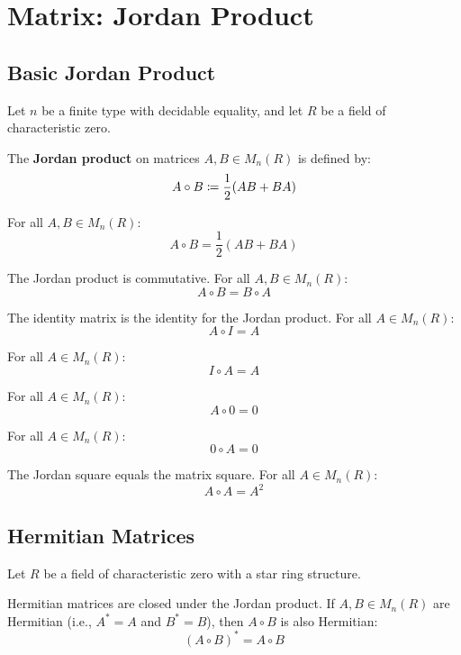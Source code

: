 \section{Matrix: Jordan Product}

\subsection{Basic Jordan Product}

Let $n$ be a finite type with decidable equality, and let $R$ be a field of characteristic zero.

\begin{definition}[jordanMul]
The \textbf{Jordan product} on matrices $A, B \in M_n(R)$ is defined by:
\[ A \circ B \coloneqq \frac{1}{2}(AB + BA) \]
\end{definition}

\begin{lemma}
For all $A, B \in M_n(R)$:
\[ A \circ B = \frac{1}{2}(AB + BA) \]
\end{lemma}

\begin{theorem}
The Jordan product is commutative. For all $A, B \in M_n(R)$:
\[ A \circ B = B \circ A \]
\end{theorem}

\begin{lemma}
The identity matrix is the identity for the Jordan product. For all $A \in M_n(R)$:
\[ A \circ I = A \]
\end{lemma}

\begin{lemma}
For all $A \in M_n(R)$:
\[ I \circ A = A \]
\end{lemma}

\begin{lemma}
For all $A \in M_n(R)$:
\[ A \circ 0 = 0 \]
\end{lemma}

\begin{lemma}
For all $A \in M_n(R)$:
\[ 0 \circ A = 0 \]
\end{lemma}

\begin{theorem}
The Jordan square equals the matrix square. For all $A \in M_n(R)$:
\[ A \circ A = A^2 \]
\end{theorem}

\subsection{Hermitian Matrices}

Let $R$ be a field of characteristic zero with a star ring structure.

\begin{theorem}
Hermitian matrices are closed under the Jordan product. If $A, B \in M_n(R)$ are Hermitian (i.e., $A^* = A$ and $B^* = B$), then $A \circ B$ is also Hermitian:
\[ (A \circ B)^* = A \circ B \]
\end{theorem}

